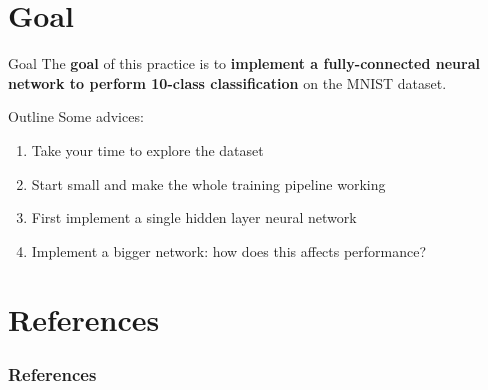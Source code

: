 \documentclass[aspectratio=169]{beamer}
\begin{document}
\section{Goal}


\begin{frame}{Goal}
The \textbf{goal} of this practice is to \textbf{implement a fully-connected neural network to perform 10-class classification} on the MNIST dataset.
\end{frame}


\begin{frame}{Outline}
Some advices:
\begin{enumerate}
\item Take your time to explore the dataset
\item Start small and make the whole training pipeline working
\item First implement a single hidden layer neural network
\item Implement a bigger network: how does this affects performance?
\end{enumerate}
\end{frame}



\section{References}

\begin{frame}[t, allowframebreaks]
\frametitle{References}


\end{frame}
\end{document}
